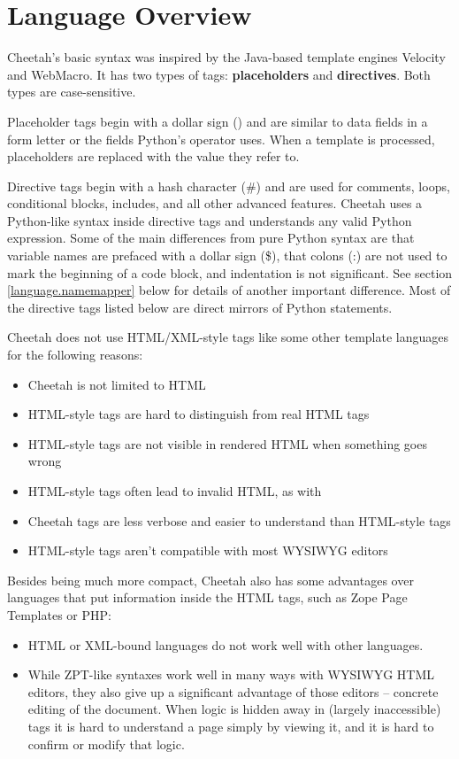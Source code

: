 \section{Language Overview}
\label{language}


Cheetah's basic syntax was inspired by the Java-based template engines Velocity
and WebMacro. It has two types of tags: {\bf placeholders} and {\bf directives}.
Both types are case-sensitive.  

Placeholder tags begin with a dollar sign () and are similar to
data fields in a form letter or the  fields Python's \code{\%}
operator uses. When a template is processed, placeholders are replaced with the
value they refer to.

Directive tags begin with a hash character (\#) and are used for comments,
loops, conditional blocks, includes, and all other advanced features. Cheetah
uses a Python-like syntax inside directive tags and understands any valid
Python expression.  Some of the main differences from pure Python syntax are
that variable names are prefaced with a dollar sign (\$), that colons (:) are
not used to mark the beginning of a code block, and indentation is not
significant.  See section \ref{language.namemapper} below for details of
another important difference. Most of the directive tags listed below are
direct mirrors of Python statements.

Cheetah does not use HTML/XML-style tags like some other template languages for
the following reasons:
\begin{itemize}
\item Cheetah is not limited to HTML
\item HTML-style tags are hard to distinguish from real HTML tags
\item HTML-style tags are not visible in rendered HTML when something goes wrong
\item HTML-style tags often lead to invalid HTML, as with
\item Cheetah tags are less verbose and easier to understand than
     HTML-style tags
\item HTML-style tags aren't compatible with most WYSIWYG editors
\end{itemize}

Besides being much more compact, Cheetah also has some advantages over
languages that put information inside the HTML tags, such as Zope Page
Templates or PHP:

\begin{itemize}
\item HTML or XML-bound languages do not work well with other languages.
\item While ZPT-like syntaxes work well in many ways with WYSIWYG HTML editors,
     they also give up a significant advantage of those editors -- concrete
     editing of the document.  When logic is hidden away in (largely
     inaccessible) tags it is hard to understand a page simply by viewing it,
     and it is hard to confirm or modify that logic.
\end{itemize}

